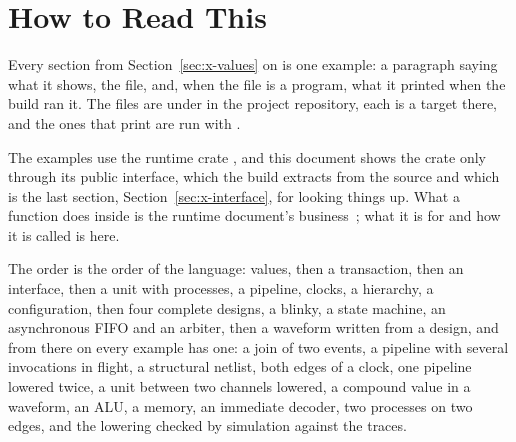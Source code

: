 \section{How to Read This}
\label{sec:x-reading}

Every section from Section~\ref{sec:x-values} on is one example: a
paragraph saying what it shows, the file, and, when the file is a
program, what it printed when the build ran it. The files are under
 in the project repository, each is a target there,
and the ones that print are run with .

The examples use the runtime crate , and this document
shows the crate only through its public interface, which the build
extracts from the source and which is the last section,
Section~\ref{sec:x-interface}, for looking things up. What a function
does inside is the runtime document's business~\cite{runtime}; what it
is for and how it is called is here.

The order is the order of the language: values, then a transaction,
then an interface, then a unit with processes, a pipeline, clocks, a
hierarchy, a configuration, then four complete designs, a blinky, a
state machine, an asynchronous FIFO and an arbiter, then a waveform
written from a design, and from there on every example has one: a
join of two events, a pipeline with several invocations in flight, a
structural netlist, both edges of a clock, one pipeline lowered
twice, a unit between two channels lowered, a compound value in a
waveform, an ALU, a memory, an immediate decoder, two processes on
two edges, and the lowering checked by simulation against the traces.
